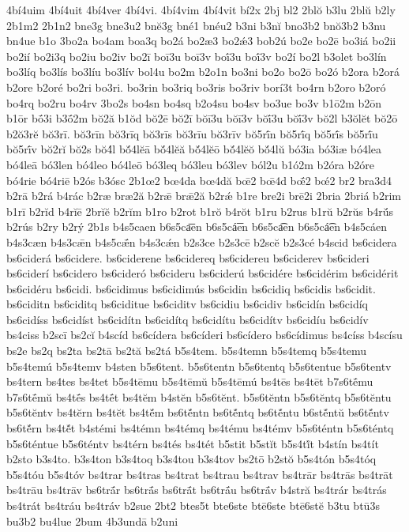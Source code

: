 {4bí4uim
4bí4uit
4bí4ver
4bí4vi.
4bí4vim
4bí4vit
bí2x
2bj
bl2
2blŏ
b3lu
2blŭ
b2ly
2b1m2
2b1n2
bne3g
bne3u2
bnĕ3g
bné1
bnéu2
b3ni
b3nĭ
bno3b2
bnŏ3b2
b3nu
bn4ue
b1o
3bo2a
bo4am
boa3q
bo2á
bo2æ3
bo2ǽ3
bob2ú
bo2e
bo2ē
bo3iá
bo2ii
bo2ií
bo2i3q
bo2iu
bo2iv
bo2ī
boī3u
boī3v
boī́3u
boī́3v
bo2í
bo2l
b3olet
bo3lín
bo3líq
bo3lís
bo3líu
bo3lív
bol4u
bo2m
b2o1n
bo3ni
bo2o
bo2ō
bo2ó
b2ora
b2orá
b2ore
b2oré
bo2ri
bo3ri.
bo3rin
bo3riq
bo3ris
bo3riv
borí3t
bo4rn
b2oro
b2oró
bo4rq
bo2ru
bo4rv
3bo2s
bo4sn
bo4sq
b2o4su
bo4sv
bo3ue
bo3v
b1ō2m
b2ōn
b1ōr
bṓ3i
b3ṓ2m
bŏ2ă
b1ŏd
bŏ2ē
bŏ2ī
bŏī3u
bŏī3v
bŏī́3u
bŏī́3v
bŏ2l
b3ŏlĕt
bŏ2ō
b2ŏ3rĕ
bŏ3rī.
bŏ3rīn
bŏ3rīq
bŏ3rīs
bŏ3rīu
bŏ3rīv
bŏ5rī́n
bŏ5rī́q
bŏ5rī́s
bŏ5rī́u
bŏ5rī́v
bŏ2rĭ
bŏ2s
bŏ4́l
bŏ́4lĕā
bŏ́4lĕă
bŏ́4lĕō
bŏ́4lĕŏ
bŏ́4lŭ
bó3ia
bó3iæ
bó4lea
bó4leā
bó3len
bó4leo
bó4leō
bó3leq
bó3leu
bó3lev
ból2u
b1ó2m
b2óra
b2óre
bó4rie
bó4riē
b2ós
b3ósc
2b1œ2
bœ4da
bœ4dă
bœ̄2
bœ̄4d
bœ̄́2
bœ́2
br2
bra3d4
b2rā
b2rá
b4rác
b2ræ
bræ2ă
b2rǣ
brǣ2ă
b2rǽ
b1re
bre2i
brē2i
2bria
2briá
b2rim
b1rī
b2rĭd
b4rĭē
2brĭĕ
b2rĭm
b1ro
b2rot
b1rŏ
b4rŏt
b1ru
b2rus
b1rŭ
b2rŭs
b4rŭ́s
b2rús
b2ry
b2rý
2b1s
b4s5caen
b6s5ca͞en
b6s5cá͞en
b6s5ca͡en
b6s5cá͡en
b4s5cáen
b4s3cæn
b4s3cǣn
b4s5cǣ́n
b4s3cǽn
b2s3ce
b2s3cē
b2scĕ
b2s3cé
b4scid
bs6cidera
bs6ciderá
bs6cidere.
bs6ciderene
bs6cidereq
bs6cidereu
bs6ciderev
bs6cideri
bs6ciderí
bs6cidero
bs6cideró
bs6cideru
bs6ciderú
bs6cidére
bs6cidérim
bs6cidérit
bs6cidéru
bs6cidi.
bs6cidimus
bs6cidimús
bs6cidin
bs6cidiq
bs6cidis
bs6cidit.
bs6ciditn
bs6ciditq
bs6ciditue
bs6ciditv
bs6cidiu
bs6cidiv
bs6cidín
bs6cidíq
bs6cidíss
bs6cidíst
bs6cidítn
bs6cidítq
bs6cidítu
bs6cidítv
bs6cidíu
bs6cidív
bs4ciss
b2scī
bs2cĭ
b4scíd
bs6cídera
bs6cíderi
bs6cídero
bs6cídimus
bs4císs
b4scísu
bs2e
bs2q
bs2ta
bs2tā
bs2tă
bs2tá
b5s4tem.
b5s4temn
b5s4temq
b5s4temu
b5s4temú
b5s4temv
b4sten
b5s6tent.
b5s6tentn
b5s6tentq
b5s6tentue
b5s6tentv
bs4tern
bs4tes
bs4tet
b5s4tēmu
b5s4tēmŭ
b5s4tēmú
bs4tēs
bs4tēt
b7s6tḗmu
b7s6tḗmŭ
bs4tḗs
bs4tḗt
bs4tĕm
b4stĕn
b5s6tĕnt.
b5s6tĕntn
b5s6tĕntq
b5s6tĕntu
b5s6tĕntv
bs4tĕrn
bs4tĕt
bs4tĕ́m
bs6tĕ́ntn
bs6tĕ́ntq
bs6tĕ́ntu
b6stĕ́ntŭ
bs6tĕ́ntv
bs6tĕ́rn
bs4tĕ́t
b4stémi
bs4témn
bs4témq
bs4tému
bs4témv
b5s6téntn
b5s6téntq
b5s6téntue
b5s6téntv
bs4térn
bs4tés
bs4tét
b5stit
b5stĭt
b5s4tĭ́t
b4stín
bs4tít
b2sto
b3s4to.
b3s4ton
b3s4toq
b3s4tou
b3s4tov
bs2tō
b2stŏ
b5s4tón
b5s4tóq
b5s4tóu
b5s4tóv
bs4trar
bs4tras
bs4trat
bs4trau
bs4trav
bs4trār
bs4trās
bs4trāt
bs4trāu
bs4trāv
bs6trā́r
bs6trā́s
bs6trā́t
bs6trā́u
bs6trā́v
b4stră
bs4trár
bs4trás
bs4trát
bs4tráu
bs4tráv
b2sue
2bt2
btes5t
bte6ste
btē6ste
btē6stĕ
b3tu
btū3s
bu3b2
bu4lue
2bum
4b3undā
b2uni
}
